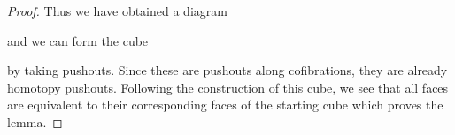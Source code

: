 \begin{lemma}
\begin{proof}
        Thus we have obtained a diagram
        \begin{center}
        \end{center}
        and we can form the cube 
        \begin{center}
        \end{center}
        by taking pushouts.
        Since these are pushouts along cofibrations, they are already homotopy pushouts. 
        Following the construction of this cube, we see that all faces are equivalent to their corresponding faces of the starting cube which proves the lemma.
    \end{proof}
\end{lemma}
